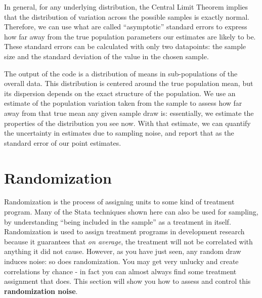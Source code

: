 In general, for any underlying distribution, the Central Limit Theorem implies that
the distribution of variation across the possible samples is exactly normal.
Therefore, we can use what are called ``asymptotic'' standard errors
to express how far away from the true population parameters our estimates are likely to be.
These standard errors can be calculated with only two datapoints:
the sample size and the standard deviation of the value in the chosen sample.


{
}

The output of the code is a distribution of means in sub-populations of the overall data.
This distribution is centered around the true population mean,
but its dispersion depends on the exact structure of the population.
We use an estimate of the population variation taken from the sample
to assess how far away from that true mean any given sample draw is:
essentially, we estimate the properties of the distribution you see now.
With that estimate, we can quantify the uncertainty in estimates due to sampling noise,
and report that as the standard error of our point estimates.

\section{Randomization}

Randomization is the process of assigning units to some kind of treatment program.
Many of the Stata techniques shown here can also be used for sampling,
by understanding ``being included in the sample'' as a treatment in itself.
Randomization is used to assign treatment programs in development research
because it guarantees that \textit{on average},
the treatment will not be correlated with anything it did not cause.\cite{duflo2007using}
However, as you have just seen, any random draw induces noise: so does randomization.
You may get very unlucky and create correlations by chance -
in fact you can almost always find some treatment assignment that does.
This section will show you how to assess and control this \textbf{randomization noise}.

